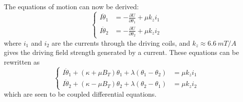\documentclass{article}
\begin{document}
The equations of motion can now be derived:
\begin{equation*}
  \begin{cases}
    I\ddot{\theta}_1 &= -\frac{\partial U}{\partial \theta_1} + \mu k_z i_1 \\
    I\ddot{\theta}_2 &= -\frac{\partial U}{\partial \theta_2} + \mu k_z i_2
  \end{cases}
\end{equation*}
where $i_1$ and $i_2$ are the currents through the driving coils, and $k_z \approx \qty{6.6}{mT/A}$ gives the driving field strength generated by a current. These equations can be rewritten as
\begin{equation*}
  \begin{cases}
    I\ddot{\theta}_1 + (\kappa + \mu B_T)\theta_1 + \lambda(\theta_1 - \theta_2) &= \mu k_z i_1\\
    I\ddot{\theta}_2 + (\kappa - \mu B_T)\theta_2 + \lambda(\theta_2 - \theta_1) &= \mu k_z i_2
  \end{cases}
\end{equation*}
which are seen to be coupled differential equations.
\end{document}
